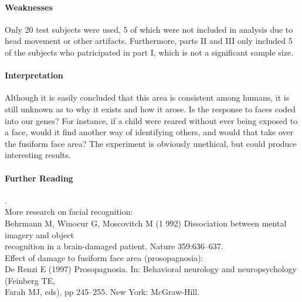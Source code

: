 \documentclass[11pt]{article}
\begin{document}
\paragraph{Weaknesses}
Only 20 test subjects were used, 5 of which were not included in analysis due to
head movement or other artifacts.  Furthermore, parts II and III only included
5 of the subjects who patricipated in part I, which is not a significant sample
size.

\paragraph{Interpretation}
Although it is easily concluded that this area is consistent among humans, it is
still unknown as to why it exists and how it arose.  Is the response to faces coded
into our genes? For instance, if a child were reared without ever being exposed to
a face, would it find another way of identifying others, and would that take over
the fusiform face area? The experiment is obviously unethical, but could produce
interesting results.

\paragraph{Further Reading} \tiny{.}\\
\normalsize
More research on facial recognition: \\
\hspace*{0.5in} Behrmann M, Winocur G, Moscovitch M (1 992) Dissociation between mental imagery and object \\
\hspace*{0.5in} recognition in a brain-damaged patient. Nature 359:636–637.\\
Effect of damage to fusiform face area (prosopagnosia):\\
\hspace*{0.5in} De Renzi E (1997) Prosopagnosia. In: Behavioral neurology and neuropsychology (Feinberg TE, \\
\hspace*{0.5in} Farah MJ, eds), pp 245–255. New York: McGraw-Hill.
\end{document}
